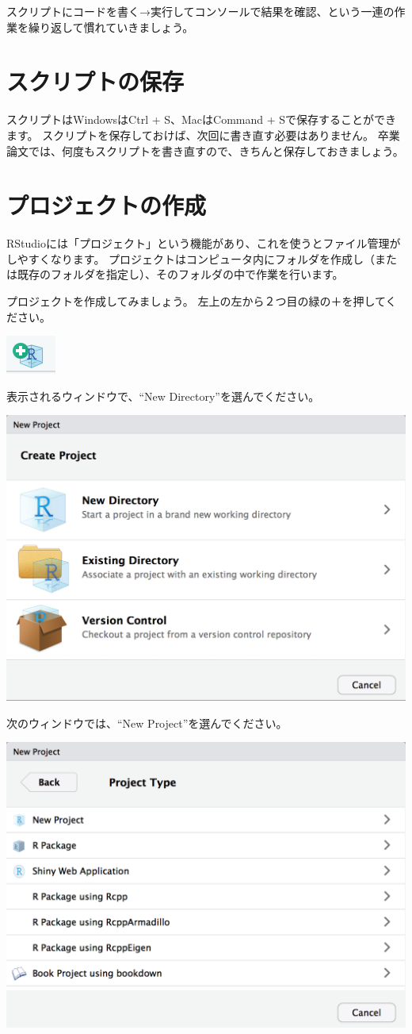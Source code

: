 \documentclass[]{book}
\begin{document}
スクリプトにコードを書く→実行してコンソールで結果を確認、という一連の作業を繰り返して慣れていきましょう。

\section{スクリプトの保存}\label{ux30b9ux30afux30eaux30d7ux30c8ux306eux4fddux5b58}

スクリプトはWindowsはCtrl + S、MacはCommand +
Sで保存することができます。
スクリプトを保存しておけば、次回に書き直す必要はありません。
卒業論文では、何度もスクリプトを書き直すので、きちんと保存しておきましょう。

\section{プロジェクトの作成}\label{ux30d7ux30edux30b8ux30a7ux30afux30c8ux306eux4f5cux6210}

RStudioには「プロジェクト」という機能があり、これを使うとファイル管理がしやすくなります。
プロジェクトはコンピュータ内にフォルダを作成し（または既存のフォルダを指定し）、そのフォルダの中で作業を行います。

プロジェクトを作成してみましょう。
左上の左から２つ目の緑の＋を押してください。

\begin{center}\includegraphics[width=0.05\linewidth]{image/project1} \end{center}

表示されるウィンドウで、``New Directory''を選んでください。

\begin{center}\includegraphics[width=0.5\linewidth]{image/project2} \end{center}

次のウィンドウでは、``New Project''を選んでください。

\begin{center}\includegraphics[width=0.5\linewidth]{image/project3} \end{center}
\end{document}
